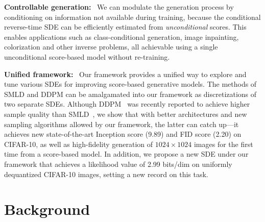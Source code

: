 \documentclass{article} \usepackage{iclr2021_conference,times}
\begin{document}
\textbf{Controllable generation:}~ We can modulate the generation process by conditioning on information not available during training, because the conditional reverse-time SDE can be efficiently estimated from \emph{unconditional} scores. This enables applications such as class-conditional generation, image inpainting, colorization and other inverse problems, all achievable using a single unconditional score-based model without re-training.


\textbf{Unified framework:}~ Our framework provides a unified way to explore and tune various SDEs for improving score-based generative models.
The methods of SMLD and DDPM can be amalgamated into our framework as discretizations of two separate SDEs. 
Although DDPM~\citep{ho2020denoising} was recently reported to achieve higher sample quality than SMLD~\citep{song2019generative,song2020improved}, we show that with better architectures and new sampling algorithms allowed by our framework, the latter can catch up---it achieves new state-of-the-art Inception score (9.89) and FID score (2.20) on CIFAR-10, as well as high-fidelity generation of $1024\times 1024$ images for the first time from a score-based model. In addition, we propose a new SDE under our framework that achieves a likelihood value of 2.99 bits/dim on uniformly dequantized CIFAR-10 images, setting a new record on this task.

 \section{Background}
\end{document}
